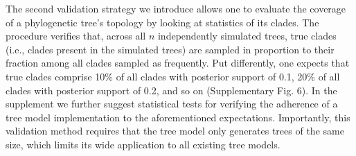 \documentclass[oneside]{article}
\begin{document}


The second validation strategy we introduce allows one to evaluate the coverage of a phylogenetic tree's topology by looking at statistics of its clades.
The procedure verifies that, across all $n$ independently simulated trees, true clades (i.e., clades present in the simulated trees) are sampled in proportion to their fraction among all clades sampled as frequently.
Put differently, one expects that true clades comprise 10\% of all clades with posterior support of 0.1, 20\% of all clades with posterior support of 0.2, and so on (Supplementary Fig. 6).
In the supplement we further suggest statistical tests for verifying the adherence of a tree model implementation to the aforementioned expectations.
Importantly, this validation method requires that the tree model only generates trees of the same size, which limits its wide application to all existing tree models.
\end{document}
